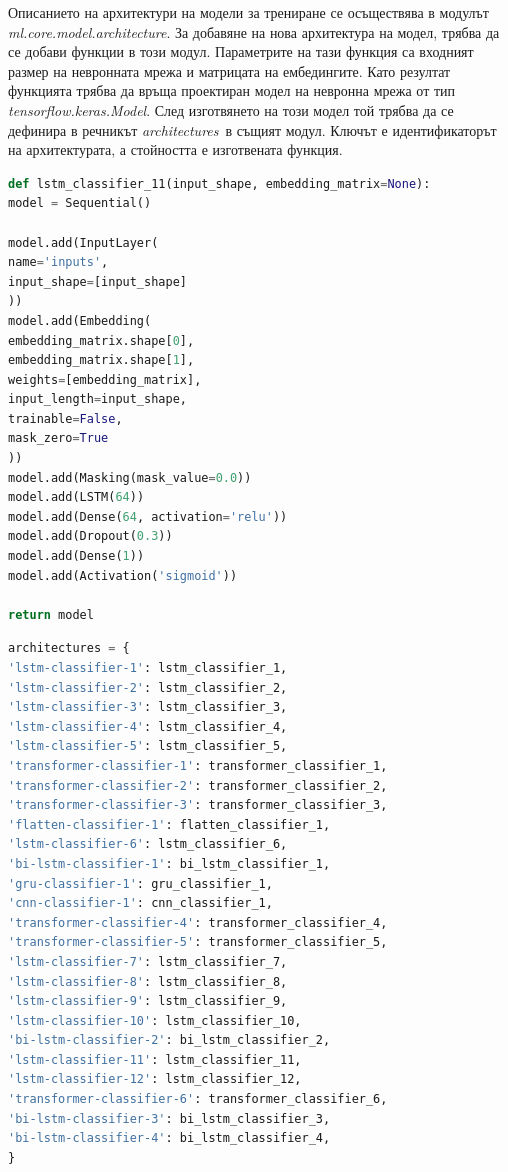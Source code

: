 \documentclass{article}
\begin{document}
    Описанието на архитектури на модели за трениране се осъществява в модулът \textit{ml.core.model.architecture}. За
    добавяне на нова архитектура на модел, трябва да се добави функции в този модул. Параметрите на тази функция са
    входният размер на невронната мрежа и матрицата на ембедингите. Като резултат функцията трябва да връща проектиран
    модел на невронна мрежа от тип \textit{tensorflow.keras.Model}. След изготвянето на този модел той трябва да се
    дефинира в речникът \textit{architectures} в същият модул. Ключът е идентификаторът на архитектурата, а стойността е
изготвената функция.

\begin{lstlisting}[language=Python, caption=Проектиране на архитектура на модел]
def lstm_classifier_11(input_shape, embedding_matrix=None):
model = Sequential()

model.add(InputLayer(
name='inputs',
input_shape=[input_shape]
))
model.add(Embedding(
embedding_matrix.shape[0],
embedding_matrix.shape[1],
weights=[embedding_matrix],
input_length=input_shape,
trainable=False,
mask_zero=True
))
model.add(Masking(mask_value=0.0))
model.add(LSTM(64))
model.add(Dense(64, activation='relu'))
model.add(Dropout(0.3))
model.add(Dense(1))
model.add(Activation('sigmoid'))

return model
\end{lstlisting}

\begin{lstlisting}[language=Python, caption=Дефиниране на архитектура]
architectures = {
'lstm-classifier-1': lstm_classifier_1,
'lstm-classifier-2': lstm_classifier_2,
'lstm-classifier-3': lstm_classifier_3,
'lstm-classifier-4': lstm_classifier_4,
'lstm-classifier-5': lstm_classifier_5,
'transformer-classifier-1': transformer_classifier_1,
'transformer-classifier-2': transformer_classifier_2,
'transformer-classifier-3': transformer_classifier_3,
'flatten-classifier-1': flatten_classifier_1,
'lstm-classifier-6': lstm_classifier_6,
'bi-lstm-classifier-1': bi_lstm_classifier_1,
'gru-classifier-1': gru_classifier_1,
'cnn-classifier-1': cnn_classifier_1,
'transformer-classifier-4': transformer_classifier_4,
'transformer-classifier-5': transformer_classifier_5,
'lstm-classifier-7': lstm_classifier_7,
'lstm-classifier-8': lstm_classifier_8,
'lstm-classifier-9': lstm_classifier_9,
'lstm-classifier-10': lstm_classifier_10,
'bi-lstm-classifier-2': bi_lstm_classifier_2,
'lstm-classifier-11': lstm_classifier_11,
'lstm-classifier-12': lstm_classifier_12,
'transformer-classifier-6': transformer_classifier_6,
'bi-lstm-classifier-3': bi_lstm_classifier_3,
'bi-lstm-classifier-4': bi_lstm_classifier_4,
}
\end{lstlisting}
\end{document}
